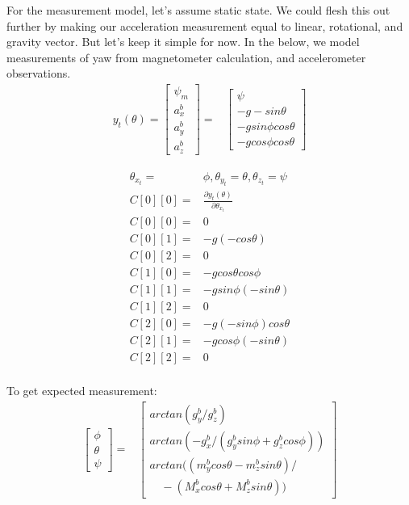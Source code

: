 \documentclass[conference]{IEEEtran}
\begin{document}
For the measurement model, let's assume static state. We could flesh this out further by making our acceleration measurement equal to linear, rotational, and gravity vector. But let's keep it simple for now. In the below, we model measurements of yaw from magnetometer calculation, and accelerometer observations.
\begin{align}
y_t(\theta) = \begin{bmatrix} \psi_m \\ a_x^b \\  a_y^b \\  a_z^b \end{bmatrix} =& \begin{bmatrix} \psi\\
															 -g -sin \theta\\
													              -g sin \phi cos \theta \\
													               -g cos \phi cos \theta \end{bmatrix} \nonumber
\end{align}

\begin{align*}
\theta_{x_{t}}=&\phi, \theta_{y_{t}}=\theta, \theta_{z_{t}}=\psi \\
C[0][0] =& \frac{\partial y_t(\theta)}{\partial\theta_{x_{t}}}\\
C[0][0] = & 0 \\
C[0][1] = & -g (-cos\theta) \\
C[0][2] = & 0 \\
C[1][0] = & -g cos\theta cos\phi \\
C[1][1] = & -g sin\phi(-sin\theta)\\
C[1][2] = & 0\\
C[2][0] = & -g (-sin\phi) cos\theta\\
C[2][1] = & -g cos\phi (-sin\theta)\\
C[2][2] = & 0\\
\end{align*}


To get expected measurement:
\begin{align}
\begin{bmatrix} \phi \\ \theta \\ \psi \end{bmatrix} =& \begin{bmatrix} arctan( g_y^b / g_z^b )\\
													arctan( - g_x^b / (g_y^b sin\phi + g_z^b cos\phi))\\
													arctan((m_y^b cos\theta - m_z^b sin\theta)  / \\
\quad - (M_x^b cos\theta + M_z^b sin\theta))
\end{bmatrix} \nonumber
\end{align}
\end{document}
